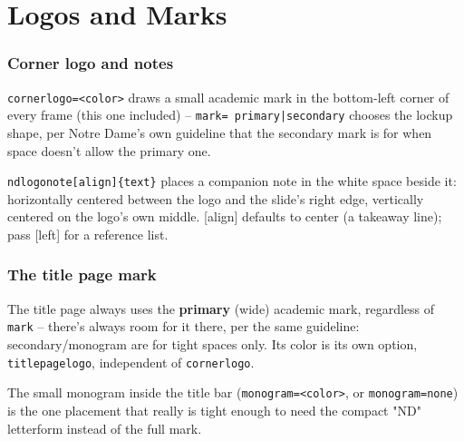 \section{Logos and Marks}

\begin{frame}[fragile]
\frametitle{Corner logo and notes}
\texttt{cornerlogo=<color>} draws a small academic mark in the
bottom-left corner of every frame (this one included) -- \texttt{mark=
primary|secondary} chooses the lockup shape, per Notre Dame's own
guideline that the secondary mark is for when space doesn't allow the
primary one.

\texttt{\bs ndlogonote[align]\{text\}} places a companion note in the
white space beside it: horizontally centered between the logo and the
slide's right edge, vertically centered on the logo's own middle.
[align] defaults to center (a takeaway line); pass [left] for a
reference list.
\end{frame}

\begin{frame}[fragile]
\frametitle{The title page mark}
The title page always uses the \textbf{primary} (wide) academic mark,
regardless of \texttt{mark} -- there's always room for it there, per
the same guideline: secondary/monogram are for tight spaces only.
Its color is its own option, \texttt{titlepagelogo}, independent of
\texttt{cornerlogo}.

The small monogram inside the title bar (\texttt{monogram=<color>},
or \texttt{monogram=none}) is the one placement that really is tight
enough to need the compact "ND" letterform instead of the full mark.
\end{frame}
